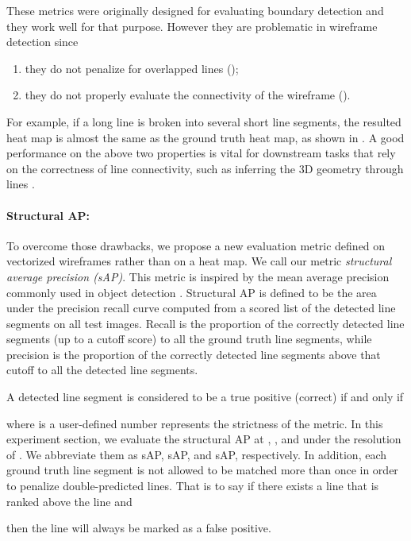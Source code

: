 \documentclass[10pt,twocolumn,letterpaper]{article}
\begin{document}
These metrics were originally designed for evaluating boundary detection \cite{martin2004learning} and they work well for that purpose.  However they are problematic in wireframe detection since
\begin{enumerate}[nosep]
    \item they do not penalize for overlapped lines ();
    \item they do not properly evaluate the connectivity of the wireframe ().  
\end{enumerate}
For example, if a long line is broken into several short line segments, the resulted heat map is almost the same as the ground truth heat map, as shown in . A good performance on the above two properties is vital for downstream tasks that rely on the correctness of line connectivity, such as inferring the 3D geometry through lines \cite{ramalingam2013lifting,zhou2019learning}.  


\paragraph{Structural AP:} To overcome those drawbacks, we propose a new evaluation metric defined on vectorized wireframes rather than on a heat map.  We call our metric \emph{structural average precision (sAP)}.  This metric is inspired by the mean average precision commonly used in object detection \cite{everingham2010pascal}.  Structural AP is defined to be the area under the precision recall curve computed from a scored list of the detected line segments on all test images.  Recall is the proportion of the correctly detected line segments (up to a cutoff score) to all the ground truth line segments, while precision is the proportion of the correctly detected line segments above that cutoff to all the detected line segments.

A detected line segment  is considered to be a true positive (correct) if and only if

where  is a user-defined number represents the strictness of the metric.  In this experiment section, we evaluate the structural AP at , , and  under the resolution of .  We abbreviate them as sAP, sAP, and sAP, respectively.  In addition, each ground truth line segment is not allowed to be matched more than once in order to penalize double-predicted lines. That is to say if there exists a line  that is ranked above the line  and

then the line  will always be marked as a false positive.
\end{document}
